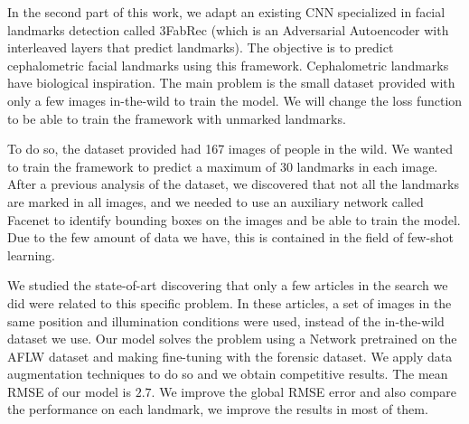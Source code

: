 \medskip

\noindent In the second part of this work, we adapt an existing CNN specialized in facial landmarks detection called 3FabRec (which is an Adversarial Autoencoder with interleaved layers that predict landmarks). The objective is to predict cephalometric facial landmarks using this framework. Cephalometric landmarks have biological inspiration. The main problem is the small dataset provided with only a few images in-the-wild to train the model. We will change the loss function to be able to train the framework with unmarked landmarks.

\medskip

\noindent To do so, the dataset provided had 167 images of people in the wild. We wanted to train the framework to predict a maximum of $30$ landmarks in each image. After a previous analysis of the dataset, we discovered that not all the landmarks are marked in all images, and we needed to use an auxiliary network called Facenet to identify bounding boxes on the images and be able to train the model. Due to the few amount of data we have, this is contained in the field of few-shot learning. 

\medskip

\noindent We studied the state-of-art discovering that only a few articles in the search we did were related to this specific problem. In these articles, a set of images in the same position and illumination conditions were used, instead of the in-the-wild dataset we use. Our model solves the problem using a Network pretrained on the AFLW dataset and making fine-tuning with the forensic dataset. We apply data augmentation techniques to do so and we obtain competitive results. The mean RMSE of our model is $2.7$. We improve the global RMSE error and also compare the performance on each landmark, we improve the results in most of them.

\endinput
